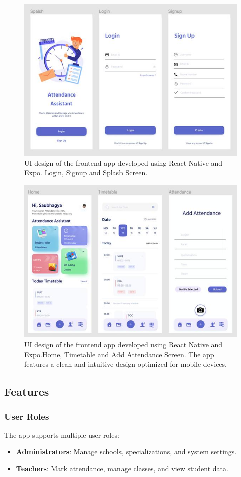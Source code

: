 \documentclass[conference]{IEEEtran}
\begin{document}
\begin{figure}
    \centering
    \includegraphics[width=.85\textwidth]{app 1.jpg}
    \caption{UI design of the frontend app developed using React Native and Expo. Login, Signup and Splash Screen.}
    \label{fig:frontend-design}
\end{figure}
\begin{figure}
    \centering
    \includegraphics[width=.85\textwidth]{app 2.jpg}
    \caption{UI design of the frontend app developed using React Native and Expo.Home, Timetable and Add Attendance Screen. The app features a clean and intuitive design optimized for mobile devices.}
    \label{fig:frontend-design2}
\end{figure}
\subsection{Features}
\subsubsection{User Roles}
The app supports multiple user roles:
\begin{itemize}
    \item \textbf{Administrators}: Manage schools, specializations, and system settings.
    \item \textbf{Teachers}: Mark attendance, manage classes, and view student data.
\end{itemize}
\end{document}
